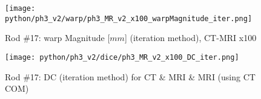 \begin{figure}[!tp]
    \centering
    \texttt{[image: python/ph3\_v2/warp/ph3\_MR\_v2\_x100\_warpMagnitude\_iter.png]}
    \caption{Rod \#17: warp Magnitude [$mm$] (iteration method), CT-MRI x100}
    \label{fig:ph3_warpMagnitude_x100}
\end{figure}

\begin{figure}[!bp]
     \centering
     \texttt{[image: python/ph3\_v2/dice/ph3\_MR\_v2\_x100\_DC\_iter.png]}
     \caption{Rod \#17: DC (iteration method) for CT \& MRI \& MRI (using CT COM)}
     \label{fig:ph3_DC_x100}
\end{figure}



